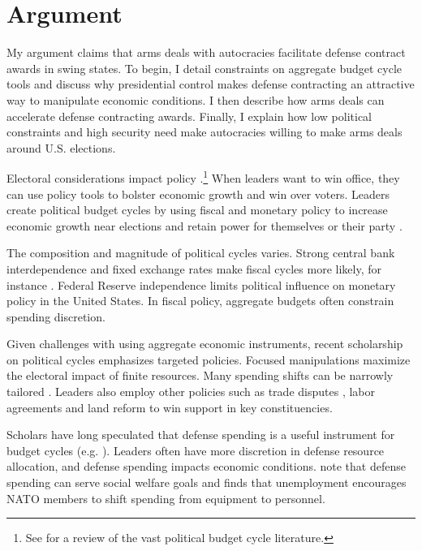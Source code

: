 \documentclass[12pt]{article}
\begin{document}
\section{Argument}


My argument claims that arms deals with autocracies facilitate defense contract awards in swing states.
To begin, I detail constraints on aggregate budget cycle tools and discuss why presidential control makes defense contracting an attractive way to manipulate economic conditions.
I then describe how arms deals can accelerate defense contracting awards. 
Finally, I explain how low political constraints and high security need make autocracies willing to make arms deals around U.S. elections.


Electoral considerations impact policy \citep{Nordhaus1975}.\footnote{See \citet{Dubois2016} for a review of the vast political budget cycle literature.} 
When leaders want to win office, they can use policy tools to bolster economic growth and win over voters. 
Leaders create political budget cycles by using fiscal and monetary policy to increase economic growth near elections and retain power for themselves or their party \citep{Tufte1978, Rogoff1987}. 


The composition and magnitude of political cycles varies. 
Strong central bank interdependence and fixed exchange rates make fiscal cycles more likely, for instance \citep{ClarkHallerberg2000}. 
Federal Reserve independence limits political influence on monetary policy in the United States. 
In fiscal policy, aggregate budgets often constrain spending discretion.


Given challenges with using aggregate economic instruments, recent scholarship on political cycles emphasizes targeted policies.
Focused manipulations maximize the electoral impact of finite resources.
Many spending shifts can be narrowly tailored \citep[pg. 248]{Dubois2016}.
Leaders also employ other policies such as trade disputes \citep{Conconietal2017}, labor agreements \citep{Ahlquist2010} and land reform \citep{Philips2020} to win support in key constituencies.


Scholars have long speculated that defense spending is a useful instrument for budget cycles (e.g. \cite{Tufte1978, Mintz1988}).
Leaders often have more discretion in defense resource allocation, and defense spending impacts economic conditions.
\citet{WhittenWilliams2011} note that defense spending can serve social welfare goals and \citet{Becker2021} finds that unemployment encourages NATO members to shift spending from equipment to personnel.
\end{document}
